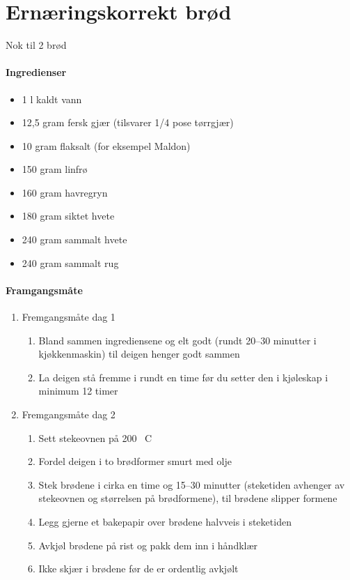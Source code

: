 \section{Ernæringskorrekt brød}
Nok til 2 brød

\paragraph{Ingredienser}
\begin{itemize}[noitemsep]
	\item 1 l kaldt vann
	\item 12,5 gram fersk gjær (tilsvarer 1/4 pose tørrgjær)
	\item 10 gram flaksalt (for eksempel Maldon)
	\item 150 gram  linfrø
	\item 160 gram  havregryn
	\item 180 gram  siktet hvete
	\item 240 gram  sammalt hvete
	\item 240 gram  sammalt rug
\end{itemize}

\paragraph{Framgangsmåte}
\begin{enumerate}[noitemsep]
	\item Fremgangsmåte dag 1
	\begin{enumerate}[noitemsep]
		\item Bland sammen ingrediensene og elt godt (rundt 20--30 minutter i kjøkkenmaskin) til deigen henger godt sammen
		\item La deigen stå fremme i rundt en time før du setter den i kjøleskap i minimum 12 timer
	\end{enumerate}
	\item Fremgangsmåte dag 2
	\begin{enumerate}[noitemsep]

		\item Sett stekeovnen på 200 \degree~C
		\item Fordel deigen i to brødformer smurt med olje
		\item Stek brødene i cirka en time og 15--30 minutter (steketiden avhenger av stekeovnen og størrelsen på brødformene), til brødene slipper formene
		\item Legg gjerne et bakepapir over brødene halvveis i steketiden
		\item Avkjøl brødene på rist og pakk dem inn i håndklær
		\item Ikke skjær i brødene før de er ordentlig avkjølt
	\end{enumerate}
\end{enumerate}

